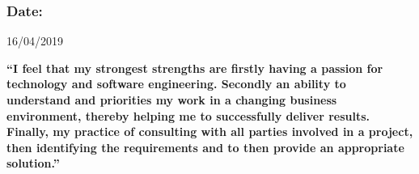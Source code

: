 \documentclass[10pt]{article}
\begin{document}
	\subsubsection{Date: }   16/04/2019
	\vspace{2cm}
	
	\large{\bf “I feel that my strongest strengths are firstly having a passion for technology and software engineering. Secondly an ability to understand and priorities my work in a changing business environment, thereby helping me to successfully deliver results. Finally, my practice of consulting with all parties involved in a project, then identifying the requirements and to then provide an appropriate solution.”}
\end{document}
